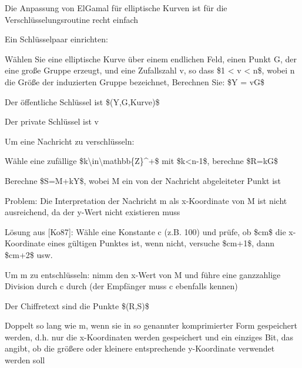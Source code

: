 \documentclass[a4paper]{article}
\begin{document}
\begin{multicols}{3}
      \begin{itemize*}
            \item Die Anpassung von ElGamal für elliptische Kurven ist für die
            Verschlüsselungsroutine recht einfach
            \item Ein Schlüsselpaar einrichten:
            \begin{itemize*}
                  \item Wählen Sie eine elliptische Kurve über einem endlichen Feld, einen Punkt G, der eine große Gruppe erzeugt, und eine Zufallszahl v, so dass \$1 \textless{} v \textless{} n\$, wobei n die Größe der induzierten Gruppe bezeichnet, Berechnen Sie: \$Y = vG\$
                  \item Der öffentliche Schlüssel ist \$(Y,G,Kurve)\$
                  \item Der private Schlüssel ist v
            \end{itemize*}
            \item Um eine Nachricht zu verschlüsseln:
            \begin{itemize*}
                  \item Wähle eine zufällige \$k\textbackslash in\textbackslash mathbb\{Z\}\^{}+\$ mit \$k\textless n-1\$, berechne \$R=kG\$
                  \item Berechne \$S=M+kY\$, wobei M ein von der Nachricht abgeleiteter Punkt ist
                  \begin{itemize*} \item Problem: Die Interpretation der Nachricht m als x-Koordinate von M ist nicht ausreichend, da der y-Wert nicht existieren muss \item Lösung aus {[}Ko87{]}: Wähle eine Konstante c (z.B. 100) und prüfe, ob \$cm\$ die x-Koordinate eines gültigen Punktes ist, wenn nicht, versuche \$cm+1\$, dann \$cm+2\$ usw. \item Um m zu entschlüsseln: nimm den x-Wert von M und führe eine ganzzahlige Division durch c durch (der Empfänger muss c ebenfalls kennen) \end{itemize*}
                  \item Der Chiffretext sind die Punkte \$(R,S)\$
                  \item Doppelt so lang wie m, wenn sie in so genannter komprimierter Form gespeichert werden, d.h. nur die x-Koordinaten werden gespeichert und ein einziges Bit, das angibt, ob die größere oder kleinere entsprechende y-Koordinate verwendet werden soll
            \end{itemize*}

\end{itemize*}
\end{multicols}
\end{document}
